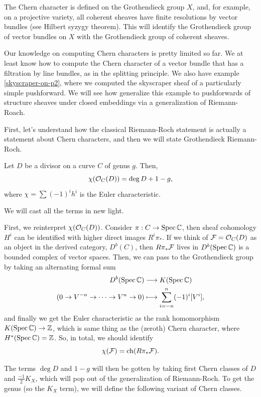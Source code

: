 \documentclass[12pt]{article}
\DeclareMathOperator{\chern}{ch}
\begin{document}
The Chern character is defined on the Grothendieck group $X$, and, for example, on a projective variety, all coherent sheaves have finite resolutions by vector bundles (see Hilbert syzygy theorem). This will identify the Grothendieck group of vector bundles on $X$ with the Grothendieck group of coherent sheaves.

Our knowledge on computing Chern characters is pretty limited so far. We at least know how to compute the Chern character of a vector bundle that has a filtration by line bundles, as in the splitting principle. We also have example \ref{skyscraper-on-p2}, where we computed the skyscraper sheaf of a particularly simple pushforward. We will see how generalize this example to pushforwards of structure sheaves under closed embeddings via a generalization of Riemann-Roach.

First, let's understand how the classical Riemann-Roch statement is actually a statement about Chern characters, and then we will state Grothendieck Riemann-Roch.

\begin{thm}
    Let $D$ be a divisor on a curve $C$ of genus $g$. Then,
    \[\chi(\mathcal{O}_C(D)) = \deg D + 1 - g,\]
    where $\chi = \sum (-1)^i h^i$ is the Euler characteristic.
\end{thm}

We will cast all the terms in new light.

First, we reinterpret $\chi(\mathcal{O}_C(D))$. Consider $\pi: C\to \operatorname{Spec} \mathbb{C}$, then sheaf cohomology $H^i$ can be identified with higher direct images $R^i\pi_*$. If we think of $\mathcal{F}=\mathcal{O}_C(D)$ as an object in the derived category, $D^b(C)$, then $R\pi_* \mathcal{F}$ lives in $D^b(\operatorname{Spec} \mathbb{C})$ is a bounded complex of vector spaces. Then, we can pass to the Grothendieck group by taking an alternating formal sum
\begin{align*}
    D^b(\operatorname{Spec} \mathbb{C}) &\longrightarrow K(\operatorname{Spec} \mathbb{C})\\
    (0\to V^{-n} \to \cdots \to V^n \to 0) &\longmapsto \sum_{i=-n}^n (-1)^i [V^i],
\end{align*}
and finally we get the Euler characteristic as the rank homomorphism $K(\operatorname{Spec} \mathbb{C}) \to \mathbb{Z}$, which is same thing as the (zeroth) Chern character, where $H^*(\operatorname{Spec}\mathbb{C}) = \mathbb{Z}$. So, in total, we should identify
\[\chi(\cF) = \chern(R\pi_* \cF).\]

The terms $\deg D$ and $1-g$ will then be gotten by taking first Chern classes of $D$ and $\frac{-1}{2} K_X$, which will pop out of the generalization of Riemann-Roch. To get the genus (so the $K_X$ term), we will define the following variant of Chern classes.
\end{document}
